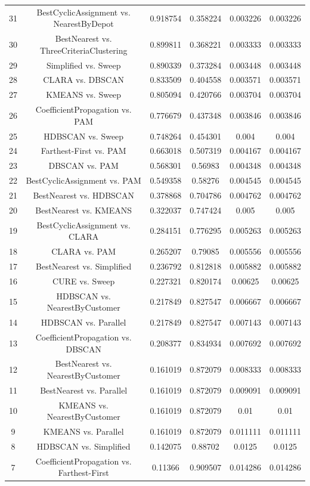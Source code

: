 \documentclass[a4paper,10pt]{article}
\begin{document}
\begin{landscape}
\begin{table}[!htp]
\begin{tabular}{cccccc}
31&BestCyclicAssignment vs. NearestByDepot&0.918754&0.358224&0.003226&0.003226\\
30&BestNearest vs. ThreeCriteriaClustering&0.899811&0.368221&0.003333&0.003333\\
29&Simplified vs. Sweep&0.890339&0.373284&0.003448&0.003448\\
28&CLARA vs. DBSCAN&0.833509&0.404558&0.003571&0.003571\\
27&KMEANS vs. Sweep&0.805094&0.420766&0.003704&0.003704\\
26&CoefficientPropagation vs. PAM&0.776679&0.437348&0.003846&0.003846\\
25&HDBSCAN vs. Sweep&0.748264&0.454301&0.004&0.004\\
24&Farthest-First vs. PAM&0.663018&0.507319&0.004167&0.004167\\
23&DBSCAN vs. PAM&0.568301&0.56983&0.004348&0.004348\\
22&BestCyclicAssignment vs. PAM&0.549358&0.58276&0.004545&0.004545\\
21&BestNearest vs. HDBSCAN&0.378868&0.704786&0.004762&0.004762\\
20&BestNearest vs. KMEANS&0.322037&0.747424&0.005&0.005\\
19&BestCyclicAssignment vs. CLARA&0.284151&0.776295&0.005263&0.005263\\
18&CLARA vs. PAM&0.265207&0.79085&0.005556&0.005556\\
17&BestNearest vs. Simplified&0.236792&0.812818&0.005882&0.005882\\
16&CURE vs. Sweep&0.227321&0.820174&0.00625&0.00625\\
15&HDBSCAN vs. NearestByCustomer&0.217849&0.827547&0.006667&0.006667\\
14&HDBSCAN vs. Parallel&0.217849&0.827547&0.007143&0.007143\\
13&CoefficientPropagation vs. DBSCAN&0.208377&0.834934&0.007692&0.007692\\
12&BestNearest vs. NearestByCustomer&0.161019&0.872079&0.008333&0.008333\\
11&BestNearest vs. Parallel&0.161019&0.872079&0.009091&0.009091\\
10&KMEANS vs. NearestByCustomer&0.161019&0.872079&0.01&0.01\\
9&KMEANS vs. Parallel&0.161019&0.872079&0.011111&0.011111\\
8&HDBSCAN vs. Simplified&0.142075&0.88702&0.0125&0.0125\\
7&CoefficientPropagation vs. Farthest-First&0.11366&0.909507&0.014286&0.014286\\

\end{tabular}
\end{table}
\end{landscape}
\end{document}
